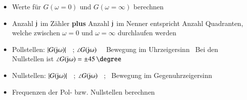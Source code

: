 \begin{itemize}
    \item Werte für $G(\omega = 0)$ und $G(\omega = \infty)$ berechnen
    \item Anzahl $\mathrm{j}$ im Zähler \textbf{plus} Anzahl $\mathrm{j}$ im Nenner entspricht Anzahl Quadranten, welche zwischen $\omega = 0$ und 
        $\omega = \infty$ durchlaufen werden
    \item Pollstellen: $|G(\mathrm{j} \omega)|$ \textdownarrow\ ; $\angle G(\mathrm{j} \omega)$ \textdownarrow\ \textrightarrow\ Bewegung im Uhrzeigersinn
        \textrightarrow\ Bei den Nullstellen ist $\angle G(\jimg \omega) = \pm 45 \, \degree$
    \item Nullstellen: $|G(\mathrm{j} \omega)|$ \textuparrow\ ; $\angle G(\mathrm{j} \omega)$ \textuparrow\ ; \textrightarrow\ Bewegung im Gegenuhrzeigersinn
    \item Frequenzen der Pol- bzw. Nullstellen berechnen
\end{itemize}

